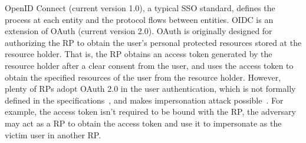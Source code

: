 OpenID Connect (current version 1.0), a typical SSO standard,  defines the process at each entity and the protocol flows between entities. OIDC is  an extension of OAuth (current version 2.0). OAuth is originally designed for authorizing the RP to obtain the user's personal protected resources stored at the resource holder. That is, the RP obtains an access token generated by the resource holder after a clear consent from the user, and  uses the access token to obtain the specified resources of the user from the resource holder. However, plenty of RPs adopt OAuth 2.0 in the user authentication, which is not formally defined in the specifications~\cite{rfc6749,rfc6750}, and makes impersonation attack possible~\cite{ChenPCTKT14, WangZLG16}. For example, the access token isn't required to be bound with the RP, the adversary may act as a RP to obtain the access token and use it to impersonate as the victim user in another RP.



